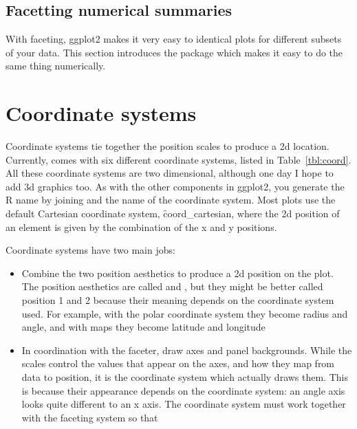 \subsection{Facetting numerical summaries}
\label{sub:plyr}

With faceting, ggplot2 makes it very easy to identical plots for different subsets of your data.  This section introduces the  package which makes it easy to do the same thing numerically.


\section{Coordinate systems}
\label{sec:coord}

Coordinate systems tie together the position scales to produce a 2d location. Currently, \ggplot comes with six different coordinate systems, listed in Table~\ref{tbl:coord}.  All these coordinate systems are two dimensional, although one day I hope to add 3d graphics too. As with the other components in ggplot2, you generate the R name by joining  and the name of the coordinate system.  Most plots use the default Cartesian coordinate system, \f{coord_cartesian}, where the 2d position of an element is given by the combination of the x and y positions.  

Coordinate systems have two main jobs: 

\begin{itemize}
  \item Combine the two position aesthetics to produce a 2d position on the plot.  The position aesthetics are called  and , but they might be better called position 1 and 2 because their meaning depends on the coordinate system used.  For example, with the polar coordinate system they become radius and angle, and with maps they become latitude and longitude
  
  \item In coordination with the faceter, draw axes and panel backgrounds.  While the scales control the values that appear on the axes, and how they map from data to position, it is the coordinate system which actually draws them.  This is because their appearance depends on the coordinate system: an angle axis looks quite different to an x axis.  The coordinate system must work together with the faceting system so that 

\end{itemize}


